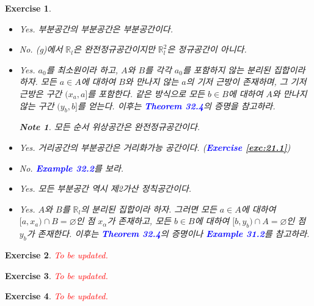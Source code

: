 \documentclass{article}
\newtheorem{exercise}{Exercise}[section]
\newtheorem*{note}{Note}
\newcommand{\R}{\mathbb{R}}
\begin{document}
\begin{exercise}
    \phantom{}
    \begin{itemize}
        \item[(a)] Yes. 부분공간의 부분공간은 부분공간이다.
        \item[(b)] No. (g)에서 $\R_l$은 완전정규공간이지만 $\R_l^2$은 정규공간이 아니다.
        \item[(c)] Yes. $a_0$를 최소원이라 하고, $A$와 $B$를 각각 $a_0$를 포함하지 않는 분리된 집합이라 하자. 모든 $a\in A$에 대하여 $B$와 만나지 않는 $a$의 기저 근방이 존재하며, 그 기저 근방은 구간 $(x_a,a]$를 포함한다. 같은 방식으로 모든 $b\in B$에 대하여 $A$와 만나지 않는 구간 $(y_b,b]$를 얻는다. 이후는 \textcolor{blue}{\textbf{Theorem 32.4}}의 증명을 참고하라.
        \begin{note}
            모든 순서 위상공간은 완전정규공간이다.
        \end{note}
        \item[(d)] Yes. 거리공간의 부분공간은 거리화가능 공간이다. (\textcolor{blue}{\textbf{Exercise \ref{exc:21.1}}})
        \item[(e)] No. \textcolor{blue}{\textbf{Example 32.2}}를 보라.
        \item[(f)] Yes. 모든 부분공간 역시 제2가산 정칙공간이다.
        \item[(g)] Yes. $A$와 $B$를 $\R_l$의 분리된 집합이라 하자. 그러면 모든 $a\in A$에 대하여 $[a,x_a)\cap B=\varnothing$인 점 $x_\alpha$가 존재하고, 모든 $b\in B$에 대하여 $[b,y_b)\cap A=\varnothing$인 점 $y_b$가 존재한다. 이후는 \textcolor{blue}{\textbf{Theorem 32.4}}의 증명이나 \textcolor{blue}{\textbf{Example 31.2}}를 참고하라.
    \end{itemize}
\end{exercise}

\begin{exercise}
    \textcolor{red}{To be updated.}
\end{exercise}

\begin{exercise}
	\textcolor{red}{To be updated.}
\end{exercise}

\begin{exercise}
	\textcolor{red}{To be updated.}
\end{exercise}
\end{document}
